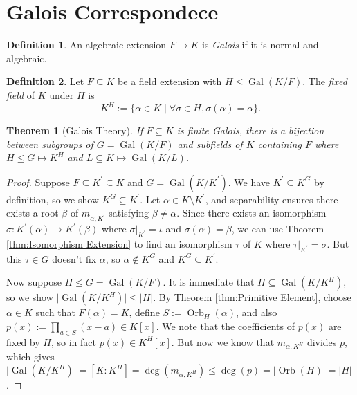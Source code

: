\documentclass[
    parskip=half,
    toc=flat,
    toc=sectionentrydotfill,
]{scrartcl}  %
\theoremstyle{definition}
\newtheorem{definition}{Definition}[section]
\theoremstyle{plain}
\newtheorem{theorem}{Theorem}[section]
\theoremstyle{remark}
\DeclareMathOperator{\Gal}{Gal}
\DeclareMathOperator{\Orb}{Orb}
\begin{document}
\section{Galois Correspondece}

\begin{definition}
    An algebraic extension $F\to K$ is \textit{Galois} if it is normal and algebraic.
\end{definition}

\begin{definition}
    Let $F\subseteq K$ be a field extension with $H\leq\Gal(K/F)$.
    The \textit{fixed field} of $K$ under $H$ is
    \[K^H:=\{\alpha\in K\mid\forall\sigma\in H, \sigma(\alpha)=\alpha\}\text{.}\]
\end{definition}

\begin{theorem}[Galois Theory]
    If $F\subseteq K$ is finite Galois, there is a bijection between subgroups of $G=\Gal(K/F)$ and subfields of
    $K$ containing $F$ where $H\leq G\mapsto K^H$ and $L\subseteq K\mapsto \Gal(K/L)$.
\end{theorem}

\begin{proof}
    Suppose $F\subseteq K^\prime\subseteq K$ and $G=\Gal(K/K^\prime)$.
    We have $K^\prime\subseteq K^G$ by definition, so we show $K^G\subseteq K^\prime$.
    Let $\alpha\in K\setminus K^\prime$, and separability ensures there exists a root $\beta$ of $m_{\alpha,K^\prime}$
    satisfying $\beta\neq\alpha$.
    Since there exists an isomorphism $\sigma:K^\prime(\alpha)\to K^\prime(\beta)$ where
    $\sigma\vert_{K^\prime}=\iota$ and $\sigma(\alpha)=\beta$, we can use Theorem \ref{thm:Isomorphism Extension} to find
    an isomorphism $\tau$ of $K$ where $\tau\vert_{K^\prime}=\sigma$.
    But this $\tau\in G$ doesn't fix $\alpha$, so $\alpha\notin K^G$ and $K^G\subseteq K^\prime$.

    Now suppose $H\leq G=\Gal(K/F)$.
    It is immediate that $H\subseteq\Gal(K/K^H)$, so we show $\lvert\Gal(K/K^H)\rvert\leq\lvert H\rvert$.
    By Theorem \ref{thm:Primitive Element}, choose $\alpha\in K$ such that $F(\alpha)=K$, define $S:=\Orb_H(\alpha)$,
    and also $p(x):=\prod_{a\in S}(x-a)\in K[x]$.
    We note that the coefficients of $p(x)$ are fixed by $H$, so in fact $p(x)\in K^H[x]$.
    But now we know that $m_{\alpha,K^H}$ divides $p$, which gives
    $\lvert\Gal(K/K^H)\rvert=[K:K^H]=\deg(m_{\alpha,K^H})\leq\deg(p)=\lvert\Orb(H)\rvert=\lvert H\rvert$.
\end{proof}
\end{document}

